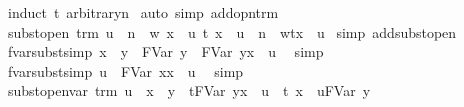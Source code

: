 \begin{isabellebody}
%
\isadelimproof
%
\endisadelimproof
%
\isatagproof
{}\isamarkupfalse%
\ {\isacharparenleft}induct\ t\ arbitrary{\isacharcolon}n{\isacharparenright}\isanewline
{}\isamarkupfalse%
\ {\isacharparenleft}auto\ simp\ add{\isacharcolon}opn{\isacharunderscore}trm{\isacharparenright}%
\endisatagproof
{\isafoldproof}%
%
\isadelimproof
\isanewline
%
\endisadelimproof
\isanewline
{}\isamarkupfalse%
\ subst{\isacharunderscore}open{}{\isacharcolon}\ {\isachardoublequoteopen}trm\ u\ {\isasymLongrightarrow}\ {\isacharbraceleft}n\ {\isasymrightarrow}\ w\ {\isacharbrackleft}x\ {\isacharcolon}{\isacharcolon}{\isacharequal}\ u{\isacharbrackright}{\isacharbraceright}\ {\isacharparenleft}t\ {\isacharbrackleft}x\ {\isacharcolon}{\isacharcolon}{\isacharequal}\ u{\isacharbrackright}{\isacharparenright}\ {\isacharequal}\ {\isacharparenleft}{\isacharbraceleft}n\ {\isasymrightarrow}\ w{\isacharbraceright}t{\isacharparenright}{\isacharbrackleft}x\ {\isacharcolon}{\isacharcolon}{\isacharequal}\ u{\isacharbrackright}{\isachardoublequoteclose}\isanewline
%
\isadelimproof
%
\endisadelimproof
%
\isatagproof
{}\isamarkupfalse%
\ {\isacharparenleft}simp\ add{\isacharcolon}subst{\isacharunderscore}open{\isacharparenright}%
\endisatagproof
{\isafoldproof}%
%
\isadelimproof
\isanewline
%
\endisadelimproof
\isanewline
{}\isamarkupfalse%
\ fvar{\isacharunderscore}subst{\isacharunderscore}simp{\isacharcolon}\ {\isachardoublequoteopen}x\ {\isasymnoteq}\ y\ {\isasymLongrightarrow}\ FVar\ y\ {\isacharequal}\ FVar\ y{\isacharbrackleft}x\ {\isacharcolon}{\isacharcolon}{\isacharequal}\ u{\isacharbrackright}{\isachardoublequoteclose}\ \isanewline
%
\isadelimproof
%
\endisadelimproof
%
\isatagproof
{}\isamarkupfalse%
\ simp%
\endisatagproof
{\isafoldproof}%
%
\isadelimproof
\isanewline
%
\endisadelimproof
\isanewline
{}\isamarkupfalse%
\ fvar{\isacharunderscore}subst{\isacharunderscore}simp{}{\isacharcolon}\ {\isachardoublequoteopen}u\ {\isacharequal}\ FVar\ x{\isacharbrackleft}x\ {\isacharcolon}{\isacharcolon}{\isacharequal}\ u{\isacharbrackright}{\isachardoublequoteclose}\ \isanewline
%
\isadelimproof
%
\endisadelimproof
%
\isatagproof
{}\isamarkupfalse%
\ simp%
\endisatagproof
{\isafoldproof}%
%
\isadelimproof
\isanewline
%
\endisadelimproof
\isanewline
{}\isamarkupfalse%
\ subst{\isacharunderscore}open{\isacharunderscore}var{\isacharcolon}\ {\isachardoublequoteopen}trm\ u\ {\isasymLongrightarrow}\ x\ {\isasymnoteq}\ y\ {\isasymLongrightarrow}\ {\isacharparenleft}t{\isacharcircum}FVar\ y{\isacharparenright}{\isacharbrackleft}x\ {\isacharcolon}{\isacharcolon}{\isacharequal}\ u{\isacharbrackright}\ {\isacharequal}\ {\isacharparenleft}t\ {\isacharbrackleft}x\ {\isacharcolon}{\isacharcolon}{\isacharequal}\ u{\isacharbrackright}{\isacharparenright}{\isacharcircum}FVar\ y{\isachardoublequoteclose}\isanewline

\end{isabellebody}
